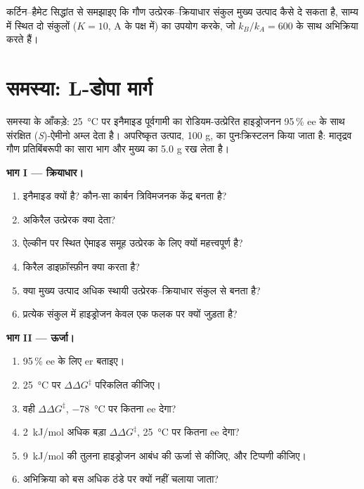 \begin{exercise}[$\star\star\star$]\label{exo:b3:asymmetric-synthesis:12}
कर्टिन--हैमेट सिद्धांत से समझाइए कि गौण उत्प्रेरक--क्रियाधार
संकुल मुख्य उत्पाद कैसे दे सकता है, साम्य में स्थित दो संकुलों
($K = 10$, A के पक्ष में) का उपयोग करके, जो $k_B/k_A = 600$ के साथ अभिक्रिया करते हैं।
\end{exercise}

\section{समस्या: L-डोपा मार्ग}

\begin{problem}
\label{pb:b3:asymmetric-synthesis:1}
समस्या के आँकड़े: \qty{25}{\celsius} पर इनैमाइड पूर्वगामी का रोडियम-उत्प्रेरित हाइड्रोजनन
95\,\% ee के साथ संरक्षित (\textit{S})-ऐमीनो अम्ल देता है। अपरिष्कृत
उत्पाद, 100 g, का पुनःक्रिस्टलन किया जाता है: मातृद्रव गौण प्रतिबिंबरूपी का सारा भाग
और मुख्य का 5.0 g रख लेता है।

\medskip\noindent\textbf{भाग I --- क्रियाधार।}
\begin{enumerate}
  \item इनैमाइड  क्यों है? कौन-सा कार्बन त्रिविमजनक केंद्र बनता है?
  \item अकिरैल उत्प्रेरक क्या देता?
  \item ऐल्कीन पर स्थित ऐमाइड समूह उत्प्रेरक के लिए क्यों महत्त्वपूर्ण है?
  \item किरैल डाइफ़ॉस्फ़ीन क्या करता है?
  \item क्या मुख्य उत्पाद अधिक स्थायी उत्प्रेरक--क्रियाधार
        संकुल से बनता है?
  \item प्रत्येक संकुल में हाइड्रोजन केवल एक फलक पर क्यों जुड़ता है?
\end{enumerate}

\medskip\noindent\textbf{भाग II --- ऊर्जा।}
\begin{enumerate}[resume]
  \item 95\,\% ee के लिए er बताइए।
  \item \qty{25}{\celsius} पर $\Delta\Delta G^\ddagger$ परिकलित कीजिए।
  \item वही $\Delta\Delta G^\ddagger$, \qty{-78}{\celsius} पर कितना ee देगा?
  \item \qty{2}{kJ/mol} अधिक बड़ा $\Delta\Delta G^\ddagger$, \qty{25}{\celsius} पर कितना ee देगा?
  \item \qty{9}{kJ/mol} की तुलना हाइड्रोजन आबंध की ऊर्जा से कीजिए, और टिप्पणी कीजिए।
  \item अभिक्रिया को बस अधिक ठंडे पर क्यों नहीं चलाया जाता?
\end{enumerate}


\end{problem}
